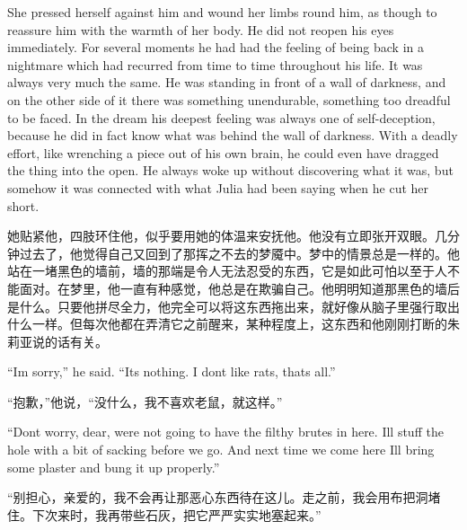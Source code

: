 \begin{paracol}{2}
She pressed herself against him and wound her limbs round him, as though
to reassure him with the warmth of her body. He did not reopen his eyes
immediately. For several moments he had had the feeling of being back in
a nightmare which had recurred from time to time throughout his life. It
was always very much the same. He was standing in front of a wall of
darkness, and on the other side of it there was something unendurable,
something too dreadful to be faced. In the dream his deepest feeling was
always one of self-deception, because he did in fact know what was
behind the wall of darkness. With a deadly effort, like wrenching a
piece out of his own brain, he could even have dragged the thing into
the open. He always woke up without discovering what it was, but somehow
it was connected with what Julia had been saying when he cut her short.

\switchcolumn

她贴紧他，四肢环住他，似乎要用她的体温来安抚他。他没有立即张开双眼。几分钟过去了，他觉得自己又回到了那挥之不去的梦魇中。梦中的情景总是一样的。他站在一堵黑色的墙前，墙的那端是令人无法忍受的东西，它是如此可怕以至于人不能面对。在梦里，他一直有种感觉，他总是在欺骗自己。他明明知道那黑色的墙后是什么。只要他拼尽全力，他完全可以将这东西拖出来，就好像从脑子里强行取出什么一样。但每次他都在弄清它之前醒来，某种程度上，这东西和他刚刚打断的朱莉亚说的话有关。

\switchcolumn*

``I\textquotesingle m sorry,'' he said. ``It\textquotesingle s nothing. I
don\textquotesingle t like rats, that\textquotesingle s all.''

\switchcolumn

``抱歉，''他说，``没什么，我不喜欢老鼠，就这样。''

\switchcolumn*

``Don\textquotesingle t worry, dear, we\textquotesingle re not going to
have the filthy brutes in here. I\textquotesingle ll stuff the hole with
a bit of sacking before we go. And next time we come here
I\textquotesingle ll bring some plaster and bung it up properly.''

\switchcolumn

``别担心，亲爱的，我不会再让那恶心东西待在这儿。走之前，我会用布把洞堵住。下次来时，我再带些石灰，把它严严实实地塞起来。''

\switchcolumn*


\end{paracol}
